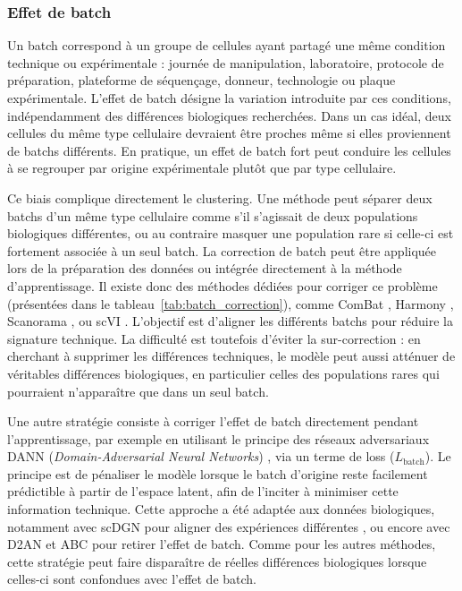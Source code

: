 \subsubsection{Effet de batch}
Un batch correspond à un groupe de cellules ayant partagé une même condition technique ou expérimentale : journée de manipulation, laboratoire, protocole de préparation, plateforme de séquençage, donneur, technologie ou plaque expérimentale. L'effet de batch désigne la variation introduite par ces conditions, indépendamment des différences biologiques recherchées. Dans un cas idéal, deux cellules du même type cellulaire devraient être proches même si elles proviennent de batchs différents. En pratique, un effet de batch fort peut conduire les cellules à se regrouper par origine expérimentale plutôt que par type cellulaire.

Ce biais complique directement le clustering. Une méthode peut séparer deux batchs d'un même type cellulaire comme s'il s'agissait de deux populations biologiques différentes, ou au contraire masquer une population rare si celle-ci est fortement associée à un seul batch. La correction de batch peut être appliquée lors de la préparation des données ou intégrée directement à la méthode d'apprentissage. Il existe donc des méthodes dédiées pour corriger ce problème (présentées dans le tableau~\ref{tab:batch_correction}), comme ComBat \cite{johnson2007adjusting}, Harmony \cite{korsunsky2019fast}, Scanorama \cite{Hie2019}, ou scVI \cite{Lopez2018scVI}. L'objectif est d'aligner les différents batchs pour réduire la signature technique. La difficulté est toutefois d'éviter la sur-correction : en cherchant à supprimer les différences techniques, le modèle peut aussi atténuer de véritables différences biologiques, en particulier celles des populations rares qui pourraient n'apparaître que dans un seul batch.

Une autre stratégie consiste à corriger l'effet de batch directement pendant l'apprentissage, par exemple en utilisant le principe des réseaux adversariaux DANN (\textit{Domain-Adversarial Neural Networks}) \cite{ganin2016domain}, via un terme de loss (\(L_{\mathrm{batch}}\)). Le principe est de pénaliser le modèle lorsque le batch d'origine reste facilement prédictible à partir de l'espace latent, afin de l'inciter à minimiser cette information technique. Cette approche a été adaptée aux données biologiques, notamment avec scDGN pour aligner des expériences différentes \cite{ge2021supervised}, ou encore avec D2AN \cite{zhu2024d2an} et ABC \cite{danino2024abc} pour retirer l'effet de batch. Comme pour les autres méthodes, cette stratégie peut faire disparaître de réelles différences biologiques lorsque celles-ci sont confondues avec l'effet de batch.

